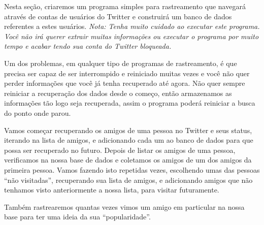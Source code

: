 Nesta seção, criaremos um programa simples para rastreamento que navegará
através de contas de usuários do Twitter e construirá um banco de dados
referentes a estes usuários.
\emph{Nota: Tenha muito cuidado ao executar este programa. Você não irá querer
  extrair muitas informações ou executar o programa por muito tempo e acabar
  tendo sua conta do Twitter bloqueada.}


Um dos problemas, em qualquer tipo de programas de rastreamento, é que precisa
ser capaz de ser interrompido e reiniciado muitas vezes e você não quer perder
informações que você já tenha recuperado até agora. Não quer sempre reiniciar
a recuperação dos dados desde o começo, então armazenamos as informações tão
logo seja recuperada, assim o programa poderá reiniciar a busca do ponto onde
parou.


Vamos começar recuperando os amigos de uma pessoa no Twitter e seus status,
iterando na lista de amigos, e adicionando cada um ao banco de dados para
que possa ser recuperado no futuro. Depois de listar os amigos de uma pessoa,
verificamos na nossa base de dados e coletamos os amigos de um dos amigos da
primeira pessoa. Vamos fazendo isto repetidas vezes, escolhendo umas das
pessoas ``não visitadas'', recuperando sua lista de amigos, e
adicionando amigos que não tenhamos visto anteriormente a nossa lista, para
visitar futuramente.


Também rastrearemos quantas vezes vimos um amigo em particular na nossa base
para ter uma ideia da sua ``popularidade''.

